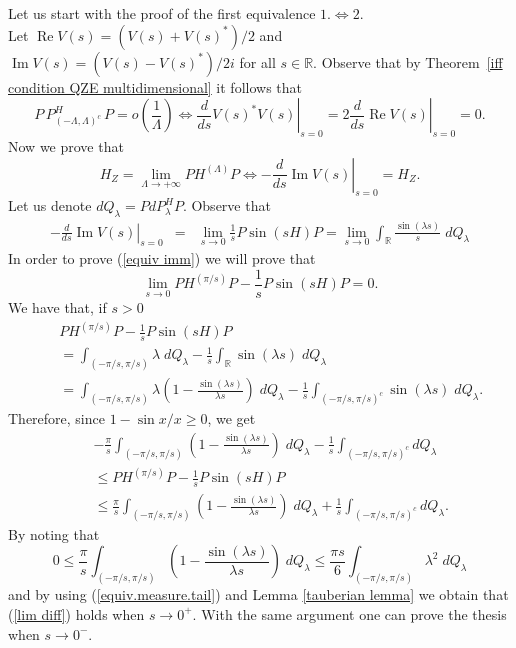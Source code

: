 \documentclass[aip,jmp,12pt
]{revtex4}
\renewcommand{\Re}{\mathop{\mathrm{Re}}\nolimits}
\renewcommand{\Im}{\mathop{\mathrm{Im}}\nolimits}
\newcommand{\RM}{\mathbb{R}}
\theoremstyle{definition}
\begin{document}
Let us start with the proof of the first equivalence $1. \Leftrightarrow 2.$\\
Let $\Re V(s)= (V(s)+V(s)^*)/2$ and $\Im V(s)= (V(s)-V(s)^*)/2 i$ for all $s \in \RM$.
Observe that by Theorem~\ref{iff condition QZE multidimensional} it follows that
\begin{equation}\label{equiv.measure.tail}
P\,P_{(-\Lambda,\Lambda)^c}^H\, P = o\left( \frac{1}{\Lambda} \right) \Leftrightarrow \left.\frac{d}{ds}V(s)^* V(s)\right|_{s=0}=2\left.\frac{d}{ds}\Re  V(s)\right|_{s=0}=0.
\end{equation}
Now we prove that
\begin{equation}\label{equiv imm}
H_{Z}=\lim_{\Lambda \to +\infty} PH^{(\Lambda)}P
\Leftrightarrow -\left.\frac{d}{ds}\Im V(s)\right|_{s=0}=H_{Z}.
\end{equation}
Let us denote $dQ_{\lambda}=PdP^{H}_{\lambda}P$.
Observe that
\begin{eqnarray*}
-\left.\frac{d}{ds} \Im V(s)\right|_{s=0} & = & \lim_{s \to 0} \frac{1}{s}P\sin(sH)P
                            = \lim_{s \to 0} \int_{\RM} \frac{\sin(\lambda s)}{s}\;dQ_{\lambda}
\end{eqnarray*}
In order to prove (\ref{equiv imm}) we will prove that
\begin{equation}\label{lim diff}
\lim_{s \to 0} PH^{(\pi/s)}P-\frac{1}{s}P\sin(sH)P= 0.
\end{equation}
We have that, if $s>0$
\begin{eqnarray*}
& & PH^{(\pi/s)}P-\frac{1}{s}P\sin(sH)P \\
& & = \int_{(-\pi/s,\pi/s)} \lambda \;dQ_{\lambda} - \frac{1}{s} \int_{\RM} \sin(\lambda s)\; dQ_{\lambda} \\
& & = \int_{(-\pi/s,\pi/s)} \lambda \left(1-\frac{\sin(\lambda s)}{\lambda s}\right)\; dQ_{\lambda}-\frac{1}{s} \int_{(-\pi/s, \pi/s)^c} \sin(\lambda s)\; dQ_{\lambda} .
\end{eqnarray*}
Therefore, since $1-\sin x/ x\geq 0$, we get
\begin{eqnarray*}
& & -\frac{\pi}{s} \int_{(-\pi/s,\pi/s)} \left(1-\frac{\sin(\lambda s)}{\lambda s}\right)\; dQ_{\lambda}-\frac{1}{s} \int_{(-\pi/s, \pi/s)^c}  dQ_{\lambda} \\
& & \leq  PH^{(\pi/s)}P-\frac{1}{s}P\sin(sH)P \\
& & \leq \frac{\pi}{s} \int_{(-\pi/s,\pi/s)} \left(1-\frac{\sin(\lambda s)}{\lambda s}\right)\; dQ_{\lambda}+\frac{1}{s} \int_{(-\pi/s, \pi/s)^c} dQ_{\lambda}.
\end{eqnarray*}
By noting that
$$
0 \leq \frac{\pi}{s}\int_{(-\pi/s, \pi/s)}\left(1-\frac{\sin(\lambda s)}{\lambda s}\right)\; dQ_{\lambda} \leq \frac{\pi s}{6} \int_{(-\pi/s, \pi/s)} \lambda^2 \; dQ_{\lambda}
$$
and by using (\ref{equiv.measure.tail}) and Lemma \ref{tauberian lemma} we obtain that (\ref{lim diff}) holds when $s\to 0^+$.
With the same argument one can prove the thesis when $s\to 0^-$.
\end{document}
